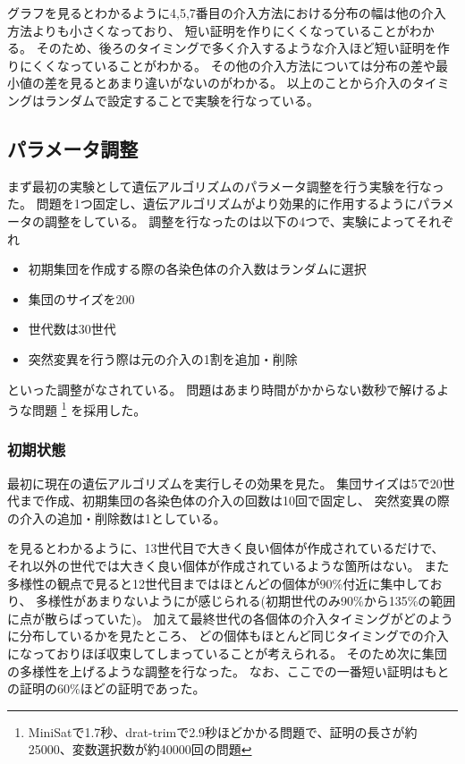 グラフを見るとわかるように4,5,7番目の介入方法における分布の幅は他の介入方法よりも小さくなっており、
短い証明を作りにくくなっていることがわかる。
そのため、後ろのタイミングで多く介入するような介入ほど短い証明を作りにくくなっていることがわかる。
その他の介入方法については分布の差や最小値の差を見るとあまり違いがないのがわかる。
以上のことから介入のタイミングはランダムで設定することで実験を行なっている。






\subsection{パラメータ調整}



まず最初の実験として遺伝アルゴリズムのパラメータ調整を行う実験を行なった。
問題を1つ固定し、遺伝アルゴリズムがより効果的に作用するようにパラメータの調整をしている。
調整を行なったのは以下の4つで、実験によってそれぞれ
\begin{itemize}
    \item 初期集団を作成する際の各染色体の介入数はランダムに選択
    \item 集団のサイズを200
    \item 世代数は30世代
    \item 突然変異を行う際は元の介入の1割を追加・削除
\end{itemize}
といった調整がなされている。
問題はあまり時間がかからない数秒で解けるような問題
\footnote{MiniSatで1.7秒、drat-trimで2.9秒ほどかかる問題で、証明の長さが約25000、変数選択数が約40000回の問題}
を採用した。




\subsubsection{初期状態}

最初に現在の遺伝アルゴリズムを実行しその効果を見た。
集団サイズは5で20世代まで作成、初期集団の各染色体の介入の回数は10回で固定し、
突然変異の際の介入の追加・削除数は1としている。


を見るとわかるように、13世代目で大きく良い個体が作成されているだけで、
それ以外の世代では大きく良い個体が作成されているような箇所はない。
また多様性の観点で見ると12世代目まではほとんどの個体が90\%付近に集中しており、
多様性があまりないようにが感じられる(初期世代のみ90\%から135\%の範囲に点が散らばっていた)。
加えて最終世代の各個体の介入タイミングがどのように分布しているかを見たところ、
どの個体もほとんど同じタイミングでの介入になっておりほぼ収束してしまっていることが考えられる。
そのため次に集団の多様性を上げるような調整を行なった。
なお、ここでの一番短い証明はもとの証明の60\%ほどの証明であった。



